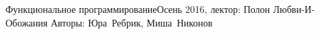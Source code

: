 


\BigHeader
	{Функциональное программирование}{Осень 2016, лектор: Полон Любви-И-Обожания}
	{Авторы: Юра~Ребрик, Миша~Никонов}


